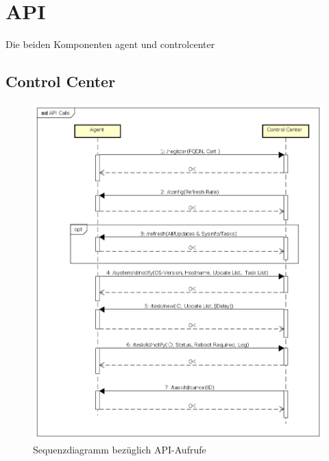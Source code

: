 \section{API}

Die beiden Komponenten \gls{agent} und \gls{controlcenter}

\subsection{Control Center}

\begin{figure}
  \centering
    \includegraphics[width=\textwidth]{fig/API_Calls}
  \caption{Sequenzdiagramm bezüglich API-Aufrufe}
  \label{fig:overview}
\end{figure}